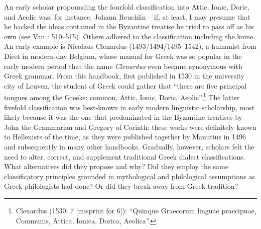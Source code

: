 \documentclass[output=paper]{langsci/langscibook}
\begin{document}
An early scholar propounding the fourfold classification into Attic, Ionic, Doric, and Aeolic was, for instance, Johann Reuchlin – if, at least, I may presume that he backed the ideas contained in the Byzantine treatise he tried to pass off as his own (see Van \citealt{Rooy2014}: 510–515). Others adhered to the classification including the koine. An early example is Nicolaus Clenardus (1493/1494/1495–1542), a humanist from Diest in modern-day Belgium, whose manual for Greek was so popular in the early modern period that the name \textit{Clenardus} even became synonymous with Greek grammar. From this handbook, first published in 1530 in the university city of Leuven, the student of Greek could gather that “there are five principal tongues among the Greeks: common, Attic, Ionic, Doric, Aeolic”.\footnote{Clenardus (1530: 7 [misprint for 6]): “Quinque Graecorum linguae praecipuae, Communis, Attica, Ionica, Dorica, Aeolica”.} The latter fivefold classification was best-known in early modern linguistic scholarship, most likely because it was the one that predominated in the Byzantine treatises by John the Grammarian and Gregory of Corinth; these works were definitely known to Hellenists of the time, as they were published together by Manutius in 1496 and subsequently in many other handbooks. Gradually, however, scholars felt the need to alter, correct, and supplement traditional Greek dialect classifications. What alternatives did they propose and why? Did they employ the same classificatory principles grounded in mythological and philological assumptions as Greek philologists had done? Or did they break away from Greek tradition?
\end{document}
